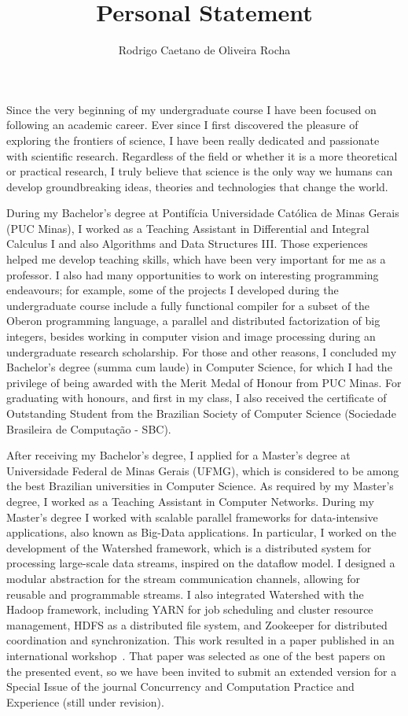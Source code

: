 \documentclass{article}
\title{Personal Statement}
\author{Rodrigo Caetano de Oliveira Rocha}
\date{}
\begin{document}
\maketitle

Since the very beginning of my undergraduate course I have been focused on
following an academic career.  Ever since I first discovered the pleasure of
exploring the frontiers of science, I have been really dedicated and passionate
with scientific research.  Regardless of the field or whether it is a more
theoretical or practical research, I truly believe that science is the only way
we humans can develop groundbreaking ideas, theories and technologies that
change the world.

During my Bachelor's degree at Pontif\'{i}cia Universidade Cat\'{o}lica de
Minas Gerais (PUC Minas), I worked as a Teaching Assistant in Differential and
Integral Calculus I and also Algorithms and Data Structures III. Those
experiences helped me develop teaching skills, which have been very important
for me as a professor. I also had many opportunities to work on interesting
programming endeavours; for example, some of the projects I developed during
the undergraduate course include a fully functional compiler for a subset of
the Oberon programming language, a parallel and distributed factorization of
big integers, besides working in computer vision and image processing during an
undergraduate research scholarship. For those and other reasons, I concluded my
Bachelor's degree (summa cum laude) in Computer Science, for which I had the
privilege of being awarded with the Merit Medal of Honour from PUC Minas.  For
graduating with honours, and first in my class, I also received the certificate
of Outstanding Student from the Brazilian Society of Computer Science
(Sociedade Brasileira de Computa\c{c}\~{a}o - SBC).

After receiving my Bachelor's degree, I applied for a Master's degree at
Universidade Federal de Minas Gerais (UFMG), which is considered to be among
the best Brazilian universities in Computer Science. As required by my Master's
degree, I worked as a Teaching Assistant in Computer Networks. During my
Master's degree I worked with scalable parallel frameworks for data-intensive
applications, also known as Big-Data applications. In particular, I worked on
the development of the Watershed framework, which is a distributed system for
processing large-scale data streams, inspired on the dataflow model. I designed
a modular abstraction for the stream communication channels, allowing for
reusable and programmable streams. I also integrated Watershed with the Hadoop
framework, including YARN for job scheduling and cluster resource management,
HDFS as a distributed file system, and Zookeeper for distributed coordination
and synchronization. This work resulted in a paper published in an
international workshop~\cite{rocha2014watershed}. That paper was selected as
one of the best papers on the presented event, so we have been invited to
submit an extended version for a Special Issue of the journal Concurrency and
Computation Practice and Experience (still under revision).
\end{document}
